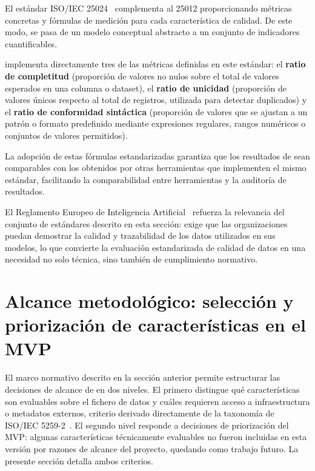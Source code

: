 El estándar \ac{ISO}/IEC 25024~\citep{iso25024} complementa al 25012
proporcionando métricas concretas y fórmulas de medición para cada
característica de calidad. De este modo, se pasa de un modelo conceptual
abstracto a un conjunto de indicadores cuantificables.

\dataqual implementa directamente tres de las métricas definidas en este
estándar: el \textbf{ratio de completitud} (proporción de valores no nulos
sobre el total de valores esperados en una columna o dataset), el
\textbf{ratio de unicidad} (proporción de valores únicos respecto al total de
registros, utilizada para detectar duplicados) y el \textbf{ratio de
conformidad sintáctica} (proporción de valores que se ajustan a un patrón o
formato predefinido mediante expresiones regulares, rangos numéricos o
conjuntos de valores permitidos).

La adopción de estas fórmulas estandarizadas garantiza que los resultados de
\dataqual sean comparables con los obtenidos por otras herramientas que
implementen el mismo estándar, facilitando la comparabilidad entre
herramientas y la auditoría de resultados.

El Reglamento Europeo de Inteligencia Artificial~\citep{aiact2024} refuerza
la relevancia del conjunto de estándares descrito en esta sección: exige que
las organizaciones puedan demostrar la calidad y trazabilidad de los datos
utilizados en sus modelos, lo que convierte la evaluación estandarizada de
calidad de datos en una necesidad no solo técnica, sino también de
cumplimiento normativo.


\section[Alcance metodológico]{Alcance metodológico: selección y priorización de características en el \ac{MVP}}
\label{sec:alcance-metodologico}

El marco normativo descrito en la sección anterior permite estructurar las
decisiones de alcance de \dataqual en dos niveles. El primero distingue qué
características son evaluables sobre el fichero de datos y cuáles requieren
acceso a infraestructura o metadatos externos, criterio derivado directamente
de la taxonomía de \ac{ISO}/IEC 5259-2~\citep{iso5259}. El segundo nivel
responde a decisiones de priorización del \ac{MVP}: algunas características
técnicamente evaluables no fueron incluidas en esta versión por razones de
alcance del proyecto, quedando como trabajo futuro. La presente sección
detalla ambos criterios.

